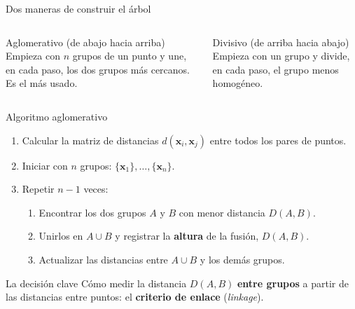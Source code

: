 \documentclass[aspectratio=169,11pt]{beamer}
\newcommand{\x}{\bm{x}}
\begin{document}
\begin{frame}{Dos maneras de construir el árbol}
  \centering
  \vspace{8pt}
  \begin{columns}[T]
    \begin{block}{Aglomerativo (de abajo hacia arriba)}
      Empieza con $n$ grupos de un punto y une, en cada paso, los dos grupos más cercanos.
      Es el más usado.
    \end{block}
    \begin{block}{Divisivo (de arriba hacia abajo)}
      Empieza con un grupo y divide, en cada paso, el grupo menos homogéneo.
    \end{block}
  \end{columns}
\end{frame}

\begin{frame}{Algoritmo aglomerativo}
  \begin{enumerate}
    \item Calcular la matriz de distancias $d(\x_i,\x_j)$ entre todos los pares de puntos.
    \item Iniciar con $n$ grupos: $\{\x_1\},\dots,\{\x_n\}$.
    \item Repetir $n-1$ veces:
      \begin{enumerate}
        \item Encontrar los dos grupos $A$ y $B$ con menor distancia $D(A,B)$.
        \item Unirlos en $A\cup B$ y registrar la \textbf{altura} de la fusión, $D(A,B)$.
        \item Actualizar las distancias entre $A\cup B$ y los demás grupos.
      \end{enumerate}
  \end{enumerate}
  \vspace{6pt}
  \begin{alertblock}{La decisión clave}
    Cómo medir la distancia $D(A,B)$ \textbf{entre grupos} a partir de las distancias entre
    puntos: el \textbf{criterio de enlace} (\emph{linkage}).
  \end{alertblock}
\end{frame}
\end{document}
